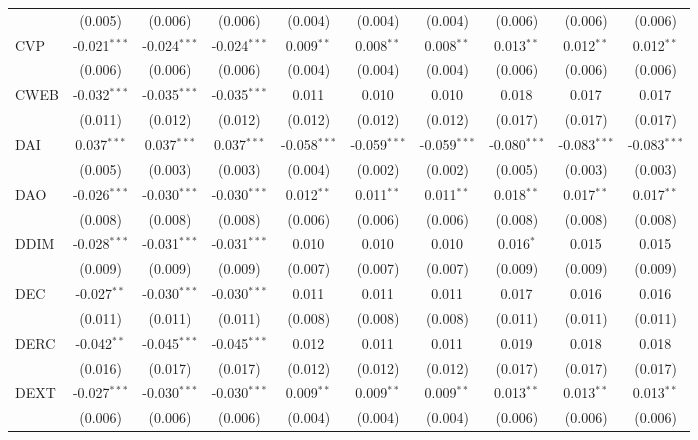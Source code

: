 \begin{table}[!htbp]
\begin{tabular}{@{\extracolsep{5pt}}lccccccccc}
  & (0.005) & (0.006) & (0.006) & (0.004) & (0.004) & (0.004) & (0.006) & (0.006) & (0.006) \\
 CVP & -0.021$^{***}$ & -0.024$^{***}$ & -0.024$^{***}$ & 0.009$^{**}$ & 0.008$^{**}$ & 0.008$^{**}$ & 0.013$^{**}$ & 0.012$^{**}$ & 0.012$^{**}$ \\
  & (0.006) & (0.006) & (0.006) & (0.004) & (0.004) & (0.004) & (0.006) & (0.006) & (0.006) \\
 CWEB & -0.032$^{***}$ & -0.035$^{***}$ & -0.035$^{***}$ & 0.011$^{}$ & 0.010$^{}$ & 0.010$^{}$ & 0.018$^{}$ & 0.017$^{}$ & 0.017$^{}$ \\
  & (0.011) & (0.012) & (0.012) & (0.012) & (0.012) & (0.012) & (0.017) & (0.017) & (0.017) \\
 DAI & 0.037$^{***}$ & 0.037$^{***}$ & 0.037$^{***}$ & -0.058$^{***}$ & -0.059$^{***}$ & -0.059$^{***}$ & -0.080$^{***}$ & -0.083$^{***}$ & -0.083$^{***}$ \\
  & (0.005) & (0.003) & (0.003) & (0.004) & (0.002) & (0.002) & (0.005) & (0.003) & (0.003) \\
 DAO & -0.026$^{***}$ & -0.030$^{***}$ & -0.030$^{***}$ & 0.012$^{**}$ & 0.011$^{**}$ & 0.011$^{**}$ & 0.018$^{**}$ & 0.017$^{**}$ & 0.017$^{**}$ \\
  & (0.008) & (0.008) & (0.008) & (0.006) & (0.006) & (0.006) & (0.008) & (0.008) & (0.008) \\
 DDIM & -0.028$^{***}$ & -0.031$^{***}$ & -0.031$^{***}$ & 0.010$^{}$ & 0.010$^{}$ & 0.010$^{}$ & 0.016$^{*}$ & 0.015$^{}$ & 0.015$^{}$ \\
  & (0.009) & (0.009) & (0.009) & (0.007) & (0.007) & (0.007) & (0.009) & (0.009) & (0.009) \\
 DEC & -0.027$^{**}$ & -0.030$^{***}$ & -0.030$^{***}$ & 0.011$^{}$ & 0.011$^{}$ & 0.011$^{}$ & 0.017$^{}$ & 0.016$^{}$ & 0.016$^{}$ \\
  & (0.011) & (0.011) & (0.011) & (0.008) & (0.008) & (0.008) & (0.011) & (0.011) & (0.011) \\
 DERC & -0.042$^{**}$ & -0.045$^{***}$ & -0.045$^{***}$ & 0.012$^{}$ & 0.011$^{}$ & 0.011$^{}$ & 0.019$^{}$ & 0.018$^{}$ & 0.018$^{}$ \\
  & (0.016) & (0.017) & (0.017) & (0.012) & (0.012) & (0.012) & (0.017) & (0.017) & (0.017) \\
 DEXT & -0.027$^{***}$ & -0.030$^{***}$ & -0.030$^{***}$ & 0.009$^{**}$ & 0.009$^{**}$ & 0.009$^{**}$ & 0.013$^{**}$ & 0.013$^{**}$ & 0.013$^{**}$ \\
  & (0.006) & (0.006) & (0.006) & (0.004) & (0.004) & (0.004) & (0.006) & (0.006) & (0.006) \\

\end{tabular}
\end{table}
